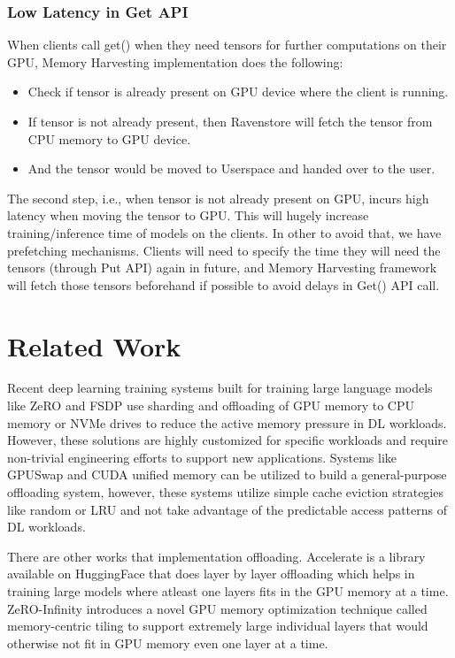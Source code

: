 \documentclass{article}
\begin{document}
	\subsubsection{Low Latency in Get API} When clients call get() when they need tensors for further computations on their GPU, Memory Harvesting implementation does the following:
	\begin{itemize}
		\item Check if tensor is already present on GPU device where the client is running.
		\item If tensor is not already present, then Ravenstore will fetch the tensor from CPU memory to GPU device.
		\item And the tensor would be moved to Userspace and handed over to the user.
	\end{itemize}
	The second step, i.e., when tensor is not already present on GPU, incurs high latency when moving the tensor to GPU.
	This will hugely increase training/inference time of models on the clients. In other to avoid that, we have prefetching mechanisms.
	Clients will need to specify the time they will need the tensors (through Put API) again in future, and Memory Harvesting framework will
	fetch those tensors beforehand if possible to avoid delays in Get() API call.

\section{Related Work}
\cite{shuklasingularity}

Recent deep learning training systems built for training large language models like ZeRO and FSDP use sharding and offloading of 
GPU memory to CPU memory or NVMe drives to reduce the active memory pressure in DL workloads. However, these solutions are highly customized 
for specific workloads and require non-trivial engineering efforts to support new applications. Systems like GPUSwap and CUDA unified 
memory can be utilized to build a general-purpose offloading system, however, these systems utilize simple cache eviction strategies 
like random or LRU and not take advantage of the predictable access patterns of DL workloads.

There are other works that implementation offloading. Accelerate is a library available on HuggingFace that does layer by layer offloading 
which helps in training large models where atleast one layers fits in the GPU memory at a time. ZeRO-Infinity introduces a novel GPU memory 
optimization technique called memory-centric tiling to support extremely large individual layers that would otherwise not fit in GPU memory 
even one layer at a time.
\end{document}
